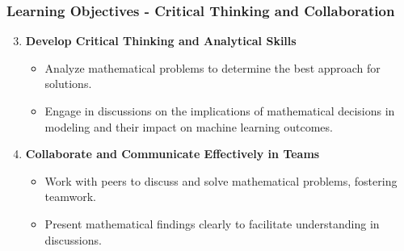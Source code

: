 \documentclass[aspectratio=169]{beamer}
\begin{document}
\begin{frame}[fragile]
    \frametitle{Learning Objectives - Critical Thinking and Collaboration}
    \begin{enumerate}\setcounter{enumi}{2}
        \item \textbf{Develop Critical Thinking and Analytical Skills}
        \begin{itemize}
            \item Analyze mathematical problems to determine the best approach for solutions.
            \item Engage in discussions on the implications of mathematical decisions in modeling and their impact on machine learning outcomes.
        \end{itemize}
        
        \item \textbf{Collaborate and Communicate Effectively in Teams}
        \begin{itemize}
            \item Work with peers to discuss and solve mathematical problems, fostering teamwork.
            \item Present mathematical findings clearly to facilitate understanding in discussions.
        \end{itemize}
    \end{enumerate}
\end{frame}
\end{document}

